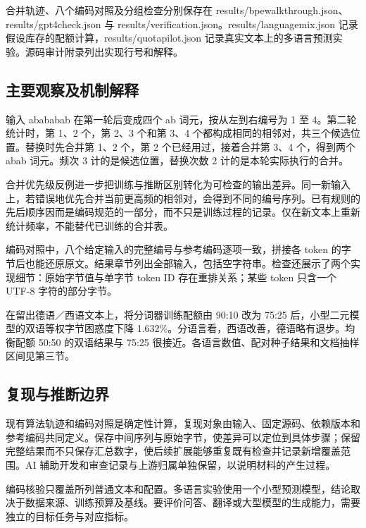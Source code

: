 \documentclass[11pt,a4paper]{article}
\newcommand{\BpeDocCodeInline}[1]{{\ttfamily #1}}
\newcommand{\BpeDocSubsection}[2]{\subsection{\texorpdfstring{#1}{#2}}}
\begin{document}
合并轨迹、八个编码对照及分组检查分别保存在 \BpeDocCodeInline{results/\allowbreak{}bpe\relax\allowbreak{}walkthrough.\allowbreak{}json}、\BpeDocCodeInline{results/\allowbreak{}gpt4\char95\relax\allowbreak{}check.\allowbreak{}json} 与 \BpeDocCodeInline{results/\allowbreak{}verification.\allowbreak{}json}。\BpeDocCodeInline{results/\allowbreak{}language\relax\allowbreak{}mix.\allowbreak{}json} 记录假设库存的配额计算，\BpeDocCodeInline{results/\allowbreak{}quota\relax\allowbreak{}pilot.\allowbreak{}json} 记录真实文本上的多语言预测实验。源码审计附录列出实现行号和解释。


\BpeDocSubsection{主要观察及机制解释}{主要观察及机制解释}


输入 abababab 在第一轮后变成四个 ab 词元，按从左到右编号为 1 至 4。第二轮统计时，第 1、2 个，第 2、3 个和第 3、4 个都构成相同的相邻对，共三个候选位置。替换时先合并第 1、2 个，第 2 个已经用过，接着合并第 3、4 个，得到两个 abab 词元。频次 3 计的是候选位置，替换次数 2 计的是本轮实际执行的合并。


合并优先级反例进一步把训练与推断区别转化为可检查的输出差异。同一新输入上，若错误地优先合并当前更高频的相邻对，会得到不同的编号序列。已有规则的先后顺序因而是编码规范的一部分，而不只是训练过程的记录。仅在新文本上重新统计频率，不能替代已训练的合并表。


编码对照中，八个给定输入的完整编号与参考编码逐项一致，拼接各 \BpeDocCodeInline{token} 的字节后也能还原原文。结果章节列出全部输入，包括空字符串。检查还展示了两个实现细节：原始字节值与单字节 \BpeDocCodeInline{token} ID 存在重排关系；某些 \BpeDocCodeInline{token} 只含一个 UTF-8 字符的部分字节。


在留出德语／西语文本上，将分词器训练配额由 90:10 改为 75:25 后，小型二元模型的双语等权字节困惑度下降 1.632\%。分语言看，西语改善，德语略有退步。均衡配额 50:50 的双语结果与 75:25 很接近。各语言数值、配对种子结果和文档抽样区间见第三节。


\BpeDocSubsection{复现与推断边界}{复现与推断边界}


现有算法轨迹和编码对照是确定性计算，复现对象由输入、固定源码、依赖版本和参考编码共同定义。保存中间序列与原始字节，使差异可以定位到具体步骤；保留完整结果而不只保存汇总数字，使后续扩展能够重复既有检查并记录新增覆盖范围。AI 辅助开发和审查记录与上游归属单独保留，以说明材料的产生过程。


编码核验只覆盖所列普通文本和配置。多语言实验使用一个小型预测模型，结论取决于数据来源、训练预算及基线。要评价问答、翻译或大型模型的生成能力，需要独立的目标任务与对应指标。
\end{document}
